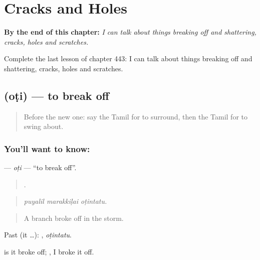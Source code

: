 
\chapter{Cracks and Holes}
\label{ch:ta-cracks-and-holes}

\begin{chapteropening}
\textbf{By the end of this chapter:} \emph{I can talk about things breaking off and shattering, cracks, holes and scratches.}

Complete the last lesson of chapter 443: I can talk about things breaking off and shattering, cracks, holes and scratches.
\end{chapteropening}

\section[\texorpdfstring{\ta{ஒடி} (oṭi)}{ஒடி (oṭi)}]{ (oṭi) — to break off}

\label{lesson:TA-C443-oti}



\begin{quote}
Before the new one: say the Tamil for to surround, then the Tamil for to swing about.
\end{quote}

\subsection*{You'll want to know: }
\textbf{} — \emph{oṭi} — \textquotedblleft{}to break off\textquotedblright{}.

\begin{quote}
  .
\end{quote}

\begin{quote}
\emph{puyalil marakkiḷai oṭintatu.}
\end{quote}

\begin{quote}
A branch broke off in the storm.
\end{quote}

Past (it …): , \emph{oṭintatu}.

 is it broke off; , I broke it off.

